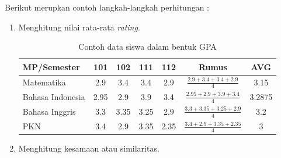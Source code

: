 Berikut merupkan contoh langkah-langkah perhitungan :

\begin{enumerate}
    \item Menghitung nilai rata-rata \textit{rating}.
    
    \begin{table}[H]
    \centering
    \begin{tabular}{|l|c|c|c|c|c|c|}
        \hline
        MP\slash Semester & 101 & 102 & 111 & 112 & Rumus & AVG \\
        \hline 
        Matematika & 2.9 & 3.4 & 3.4 & 2.9 & $\frac{2.9 + 3.4 +3.4 + 2.9}{4}$ & 3.15 \\
        \hline 
        Bahasa Indonesia & 2.95 & 2.9 & 3.9 & 3.4 & $\frac{2.95 + 2.9 + 3.9 + 3.4}{4}$ & 3.2875 \\
        \hline 
        Bahasa Inggris & 3.3 & 3.35 & 3.25 & 2.9 & $\frac{3.3 + 3.35 + 3.25 + 2.9}{4}$ & 3.2 \\
        \hline 
        PKN & 3.4 & 2.9 & 3.35 & 2.35 & $\frac{3.4 + 2.9 + 3.35 + 2.35}{4}$ & 3 \\
        \hline
    \end{tabular}
    \caption{Contoh data siswa dalam bentuk GPA}
	\label{tab:data siswa}
\end{table}

    \item Menghitung kesamaan atau similaritas.
    

\end{enumerate}
